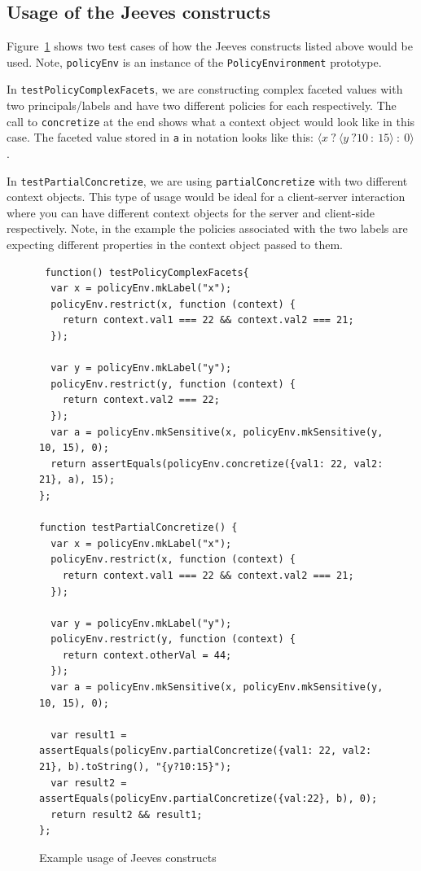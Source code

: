 \subsection{Usage of the Jeeves constructs}
Figure~\ref{fig:JeevesExamples} shows two test cases of how the Jeeves constructs
listed above would be used. Note, \texttt{policyEnv} is an instance of the
\texttt{PolicyEnvironment} prototype.

In \texttt{testPolicyComplexFacets}, we are constructing complex faceted values
with two principals/labels and have two different policies for each respectively.
The call to \texttt{concretize} at the end shows what a context object would look
like in this case. The faceted value stored in \texttt{a} in notation looks like
this: $\langle x~?~\langle y~?10~:~15 \rangle~:~0 \rangle$.

In \texttt{testPartialConcretize}, we are using \texttt{partialConcretize} with
two different context objects. This type of usage would be ideal for a client-server
interaction where you can have different context objects for the server and client-side
respectively. Note, in the example the policies associated with the two labels are
expecting different properties in the context object passed to them.

\begin{figure}
  \begin{lstlisting}
 function() testPolicyComplexFacets{
  var x = policyEnv.mkLabel("x");
  policyEnv.restrict(x, function (context) {
    return context.val1 === 22 && context.val2 === 21;
  });

  var y = policyEnv.mkLabel("y");
  policyEnv.restrict(y, function (context) {
    return context.val2 === 22;
  });
  var a = policyEnv.mkSensitive(x, policyEnv.mkSensitive(y, 10, 15), 0);
  return assertEquals(policyEnv.concretize({val1: 22, val2: 21}, a), 15);
};

function testPartialConcretize() {
  var x = policyEnv.mkLabel("x");
  policyEnv.restrict(x, function (context) {
    return context.val1 === 22 && context.val2 === 21;
  });

  var y = policyEnv.mkLabel("y");
  policyEnv.restrict(y, function (context) {
    return context.otherVal = 44;
  });
  var a = policyEnv.mkSensitive(x, policyEnv.mkSensitive(y, 10, 15), 0);

  var result1 = assertEquals(policyEnv.partialConcretize({val1: 22, val2: 21}, b).toString(), "{y?10:15}");
  var result2 = assertEquals(policyEnv.partialConcretize({val:22}, b), 0);
  return result2 && result1;
};
  \end{lstlisting}
  \caption{Example usage of Jeeves constructs}
  \label{fig:JeevesExamples}
\end{figure}

